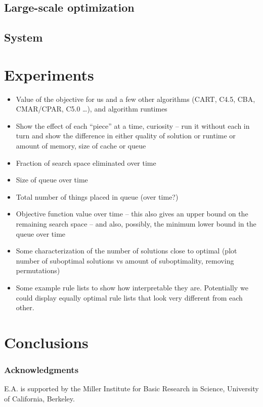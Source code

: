 \subsection{Large-scale optimization}

\subsection{System}

\section{Experiments}

\begin{itemize}

\item Value of the objective for us and a few other algorithms (CART, C4.5, CBA, CMAR/CPAR, C5.0 \dots), and algorithm runtimes 

\item Show the effect of each ``piece'' at a time, \eg curiosity -- run it without each in turn and show the difference in either quality of solution or runtime or amount of memory, size of cache or queue

\item Fraction of search space eliminated over time

\item Size of queue over time

\item Total number of things placed in queue (over time?)

\item Objective function value over time -- this also gives an upper bound on the remaining search space -- and also, possibly, the minimum lower bound in the queue over time

\item Some characterization of the number of solutions close to optimal (plot number of suboptimal solutions vs amount of suboptimality, removing permutations)

\item Some example rule lists to show how interpretable they are. Potentially we could display equally optimal rule lists that look very different from each other. 

\end{itemize}

\section{Conclusions}

\subsubsection*{Acknowledgments}

E.A. is supported by the Miller Institute for Basic Research in Science, University of California, Berkeley.



